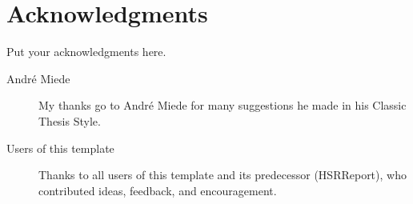 
\chapter*{Acknowledgments}
Put your acknowledgments here.

\begin{description}
    \item[André Miede] My thanks go to André Miede for many suggestions
        he made in his Classic Thesis Style.
    \item[Users of this template] Thanks to all users of this template and
        its predecessor (HSRReport), who contributed ideas, feedback,
        and encouragement.
\end{description}
